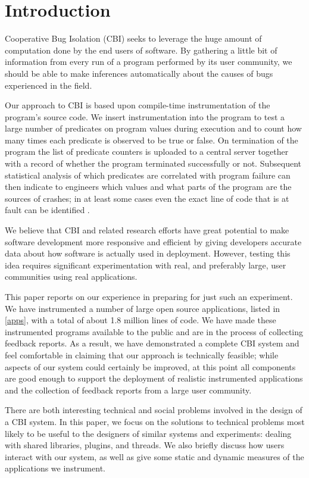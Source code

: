 \documentclass[10pt,twocolumn]{article}
\begin{document}
\section{Introduction}

Cooperative Bug Isolation (CBI) seeks to leverage the
huge amount of computation done by the end users of software.  By
gathering a little bit of information from every run of a
program performed by its user community, we should be able to make
inferences automatically about the causes of bugs experienced in the field.

Our approach to CBI is based upon compile-time instrumentation of the
program's source code.  We insert instrumentation into the program to
test a large number of predicates on program values during
execution and to count how many times each predicate is observed to be
true or false.  On termination of the program the list of predicate
counters is uploaded to a central server together with a record of
whether the program terminated successfully or not.  Subsequent
statistical analysis of which predicates are correlated with program
failure can then indicate to engineers which values and what parts of
the program are the sources of crashes; in at least some cases even
the exact line of code that is at fault can be identified \cite{PLDI`03*141,Liblit:2003:SUEBI,Zheng:2003:SDSP}.

We believe that CBI and related research efforts have great potential
to make software development more responsive and efficient by giving
developers accurate data about how software is actually used in
deployment.  However, testing this idea requires significant
experimentation with real, and preferably large, user communities
using real applications.

This paper reports on our experience in preparing for just such an
experiment.  We have instrumented a number of large open source
applications, listed in \autoref{apps}, with a total of about 1.8
million lines of code. We have made these instrumented programs
available to the public and are in the process of collecting feedback
reports.  As a result, we have demonstrated a complete CBI system and
feel comfortable in claiming that our approach is technically
feasible; while aspects of our system could certainly be improved, at
this point all components are good enough to support the deployment of
realistic instrumented applications and the collection of feedback
reports from a large user community.

There are both interesting technical and social problems involved in
the design of a CBI system.  In this paper, we focus on the solutions
to technical problems most likely to be useful to the designers of
similar systems and experiments: dealing with shared libraries,
plugins, and threads.  We also briefly discuss how users interact with
our system, as well as give some static and dynamic measures of the
applications we instrument.
\end{document}
